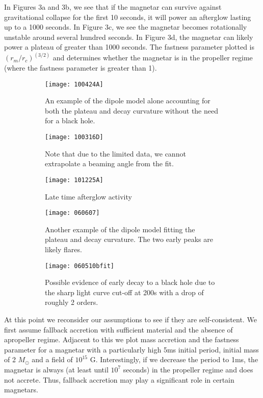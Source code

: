 \documentclass{article}
\begin{document}
In Figures 3a and 3b, we see that if the magnetar can survive against gravitational collapse for the first 10 seconds, it will power an afterglow lasting up to a 1000 seconds. In Figure 3c, we see the magnetar becomes rotationally unstable around several hundred seconds. In Figure 3d, the magnetar can likely power a plateau of greater than 1000 seconds. The fastness parameter plotted is $(r_m/r_c)^(3/2)$ and determines whether the magnetar is in the propeller regime (where the fastness parameter is greater than 1).
\newpage

\begin{figure}[h!]
\centering
\begin{subfigure}{.4\textwidth}
    \centering
    \texttt{[image: 100424A]}
    \caption{An example of the dipole model alone accounting for both the plateau and decay curvature without the need for a black hole.}
    \label{}
\end{subfigure}%
\begin{subfigure}{.4\textwidth}
    \centering
    \texttt{[image: 100316D]}
    \caption{Note that due to the limited data, we cannot extrapolate a beaming angle from the fit.}
    \label{}
\end{subfigure}
\begin{subfigure}{.4\textwidth}
    \centering
    \texttt{[image: 101225A]}
    \caption{Late time afterglow activity}
    \label{}
\end{subfigure}%
\begin{subfigure}{.4\textwidth}
    \centering
    \texttt{[image: 060607]}
    \caption{Another example of the dipole model fitting the plateau and decay curvature. The two early peaks are likely flares.}
    \label{}
\end{subfigure}
\begin{subfigure}{.5\textwidth}
    \centering
    \texttt{[image: 060510bfit]}
    \caption{Possible evidence of early decay to a black hole due to the sharp light curve cut-off at 200s with a drop of roughly 2 orders.}
    \label{}
\end{subfigure}
\caption{}
\label{fig:4}
\end{figure}

\newpage
At this point we reconsider our assumptions to see if they are self-consistent. We first assume fallback accretion with sufficient material and the absence of apropeller regime. Adjacent to this we plot mass accretion and the fastness parameter for a magnetar with a particularly high 5ms initial period, initial mass of 2 $M_{\odot}$ and a field of $10^{15}$ G. Interestingly, if we decrease the period to 1ms, the magnetar is always (at least until $10^7$ seconds) in the propeller regime and does not accrete. Thus, fallback accretion may play a significant role in certain magnetars.
\end{document}
